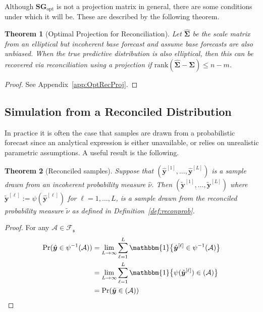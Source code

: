 \documentclass[a4paper,12pt]{article}
\newtheorem{theo}{Theorem}[section]
\theoremstyle{definition}
\begin{document}
Although $\bm{S}\bm{G}_{\text{opt}}$ is not a projection matrix in general, there are some conditions under which it will be. These are described by the following theorem.
\begin{theo}[Optimal Projection for Reconciliation]\label{theo:OptRecProj}
	Let $\hat{\bm{\Sigma}}$ be the scale matrix from an elliptical but incoherent base forecast and assume base forecasts are also unbiased. When the true predictive distribution is also elliptical, then this can be recovered via reconciliation using a projection if $\textrm{rank}(\hat{\bm{\Sigma}}-\bm{\Sigma})\leq n-m$.
\end{theo}
\begin{proof}
	See Appendix~\ref{app:OptRecProj}.
\end{proof}

\subsection{Simulation from a Reconciled Distribution}\label{sec:SampleSolution}

In practice it is often the case that samples are drawn from a probabilistic forecast since an analytical expression is either unavailable, or relies on unrealistic parametric assumptions. A useful result is the following.
\begin{theo}[Reconciled samples]
	Suppose that $\left(\hat{\bm{y}}^{[1]},\ldots,\hat{\bm{y}}^{[L]}\right)$ is a sample drawn from an incoherent probability measure $\hat{\nu}$. Then $\left(\tilde{\bm{y}}^{[1]},\ldots,\tilde{\bm{y}}^{[L]}\right)$ where $\tilde{\bm{y}}^{[\ell]}:=\psi(\hat{\bm{y}}^{[\ell]})$ for $\ell=1,\ldots,L$, is a sample drawn from the reconciled probability measure $\tilde{\nu}$ as defined in Definition~\ref{def:reconprob}.
\end{theo}
\begin{proof}
	For any $\mathcal{A}\in\mathscr{F}_{\mathfrak{s}}$
	\begin{align}
	\mbox{Pr}(\hat{\bm{y}}\in\psi^{-1}(\mathcal{A}))&=\underset{L\rightarrow\infty}{\lim}\sum\limits_{\ell=1}^L\mathbbm{1}\big\{\hat{\bm{y}}^{[\ell]}\in\psi^{-1}(\mathcal{A})\big\}\nonumber\\
	&=\underset{L\rightarrow\infty}{\lim}\sum\limits_{\ell=1}^L\mathbbm{1}\big\{\psi(\hat{\bm{y}}^{[\ell]})\in(\mathcal{A})\big\}\nonumber\\
	&=\mbox{Pr}(\tilde{\bm{y}}\in(\mathcal{A}))\nonumber
	\end{align}
\end{proof}
\end{document}
